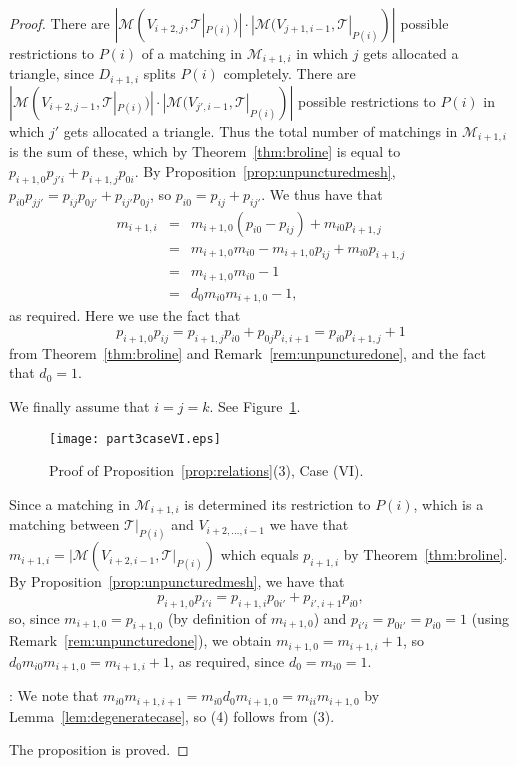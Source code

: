 \documentclass[a4paper]{amsart}
\begin{document}
\begin{proof}
There are $|{\mathcal M}(V_{i+2,j},{\mathcal T}|_{P(i)})|\cdot |{\mathcal M}(V_{j+1,i-1},{\mathcal T}|_{P(i)})|$
possible restrictions to $P(i)$ of a matching in ${\mathcal M}_{i+1,i}$ in which $j$
gets allocated a triangle, since $D_{i+1,i}$ splits $P(i)$ completely.
There are
$|{\mathcal M}(V_{i+2,j-1},{\mathcal T}|_{P(i)})|\cdot |{\mathcal M}(V_{j',i-1},{\mathcal T}|_{P(i)})|$
possible restrictions to $P(i)$ in which $j'$ gets allocated a triangle.
Thus the total number of matchings in ${\mathcal M}_{i+1,i}$ is the sum of these,
which by Theorem~\ref{thm:broline} is equal to
$p_{i+1,0}p_{j'i}+p_{i+1,j}p_{0i}$.
By Proposition~\ref{prop:unpuncturedmesh}, $p_{i0}p_{jj'}=p_{ij}p_{0j'}+p_{ij'}p_{0j}$,
so $p_{i0}=p_{ij}+p_{ij'}$. We thus have that
\begin{eqnarray*}
m_{i+1,i} &=& m_{i+1,0}(p_{i0}-p_{ij})+m_{i0}p_{i+1,j} \\
&=& m_{i+1,0}m_{i0}-m_{i+1,0}p_{ij}+m_{i0}p_{i+1,j} \\
&=& m_{i+1,0}m_{i0}-1 \\
&=& d_0m_{i0}m_{i+1,0}-1,
\end{eqnarray*}
as required. Here we use the fact that
$$p_{i+1,0}p_{ij}=p_{i+1,j}p_{i0}+p_{0j}p_{i,i+1}=p_{i0}p_{i+1,j}+1$$
from Theorem~\ref{thm:broline} and Remark~\ref{rem:unpuncturedone},
and the fact that $d_0=1$.

We finally assume that $i=j=k$.
See Figure~\ref{fig:part3caseVI}.
\begin{figure}
\begin{center}
\texttt{[image: part3caseVI.eps]}
\caption{Proof of Proposition~\ref{prop:relations}(3), Case (VI).}
\label{fig:part3caseVI}
\end{center}
\end{figure}

Since a matching in ${\mathcal M}_{i+1,i}$ is determined its restriction to
$P(i)$, which is a matching between ${\mathcal T}|_{P(i)}$ and $V_{i+2,\ldots ,i-1}$
we have that $m_{i+1,i}=|{\mathcal M}(V_{i+2,i-1},{\mathcal T}|_{P(i)})$
which equals $p_{i+1,i}$ by Theorem~\ref{thm:broline}.
By Proposition~\ref{prop:unpuncturedmesh}, we have that
$$p_{i+1,0}p_{i'i}=p_{i+1,i}p_{0i'}+p_{i',i+1}p_{i0},$$
so, since $m_{i+1,0}=p_{i+1,0}$ (by definition of $m_{i+1,0}$)
and $p_{i'i}=p_{0i'}=p_{i0}=1$ (using Remark~\ref{rem:unpuncturedone}),
we obtain $m_{i+1,0}=m_{i+1,i}+1$, so $d_0m_{i0}m_{i+1,0}=m_{i+1,i}+1$,
as required, since $d_0=m_{i0}=1$.

: We note that $m_{i0}m_{i+1,i+1}=
m_{i0}d_0m_{i+1,0}=m_{ii}m_{i+1,0}$ by Lemma~\ref{lem:degeneratecase},
so (4) follows from (3).

The proposition is proved.
\end{proof}
\end{document}
